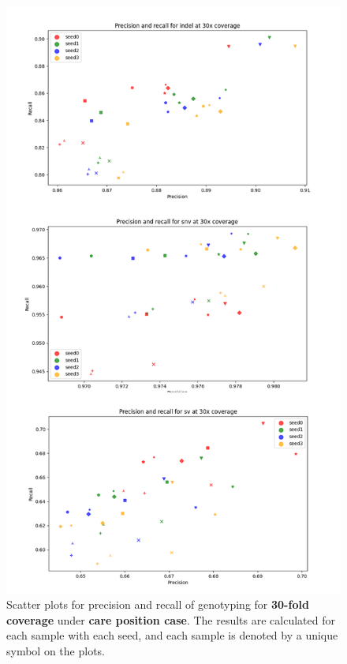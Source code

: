 \documentclass{PHlab-thesis}
\begin{document}
\begin{figure}[ht!]
	\centering
	\includegraphics[scale=0.5]{figures/care_genotyping_30x.png}
	\caption{Scatter plots for precision and recall of genotyping for \textbf{30-fold coverage} under \textbf{care position case}. The results are calculated for each sample with each seed, and each sample is denoted by a unique symbol on the plots.}
	\label{fig:care_genotyping_30x} %
\end{figure}
\end{document}
